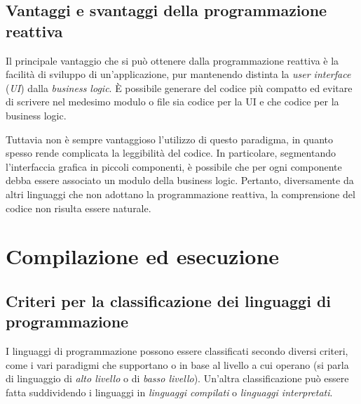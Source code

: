 \subsection{Vantaggi e svantaggi della programmazione reattiva}
Il principale vantaggio che si può ottenere dalla programmazione reattiva è la facilità di sviluppo di un'applicazione, pur mantenendo distinta la \textit{user interface} (\textit{UI}) dalla \textit{business logic}. È possibile generare del codice più compatto ed evitare di scrivere nel medesimo modulo o file sia codice per la UI e che codice per la business logic.

Tuttavia non è sempre vantaggioso l'utilizzo di questo paradigma, in quanto spesso rende complicata la leggibilità del codice. In particolare, segmentando l'interfaccia grafica in piccoli componenti, è possibile che per ogni componente debba essere associato un modulo della business logic. Pertanto, diversamente da altri linguaggi che non adottano la programmazione reattiva, la comprensione del codice non risulta essere naturale.

\section{Compilazione ed esecuzione}
\subsection{Criteri per la classificazione dei linguaggi di programmazione}
I linguaggi di programmazione possono essere classificati secondo diversi criteri, come i vari paradigmi che supportano o in base al livello a cui operano (si parla di linguaggio di \textit{alto livello} o di \textit{basso livello}). Un'altra classificazione può essere fatta suddividendo i linguaggi in \textit{linguaggi compilati} o \textit{linguaggi interpretati}.

